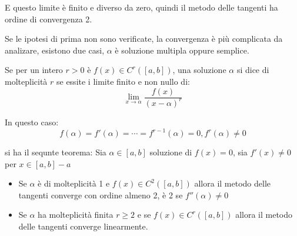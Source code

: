 E questo limite è finito e diverso da zero, quindi il metodo delle tangenti ha ordine di convergenza 2.


Se le ipotesi di prima non sono verificate, la convergenza è più complicata da analizare,
esistono due casi, $\alpha$ è soluzione multipla oppure semplice.

Se per un intero $r > 0$ è $f(x) \in C^r([a, b])$, una soluzione $\alpha$ si dice di molteplicità $r$ se 
essite i limite finito e non nullo di:
\begin{equation}
  \lim_{x \to \alpha} \frac{f(x)}{(x-\alpha)^r}
\end{equation}

In questo caso:
\begin{equation}
  f(\alpha) = f'(\alpha) = \cdots = f^{r-1}(\alpha) = 0, f^r(\alpha) \neq 0
\end{equation}

si ha il sequnte teorema:
Sia $\alpha \in [a, b]$ soluzione di $f(x)=0$, sia $f'(x)\neq 0$ per $x \in [a, b] - {a}$
\begin{itemize}
  \item Se $\alpha$ è di molteplicità 1 e $f(x)\in C^2([a, b])$ allora il metodo delle tangenti converge con ordine almeno 2, è 2 se $f''(\alpha) \neq 0$
  \item Se $\alpha$ ha molteplicità finita $r \geq 2$ e se $f(x) \in C^r([a, b])$ allora il metodo delle tangenti converge linearmente.
\end{itemize}


